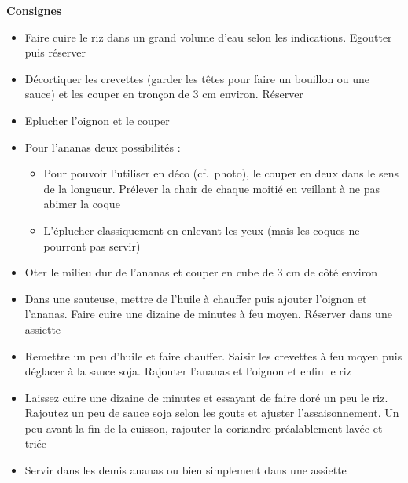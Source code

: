 \documentclass[]{book}
\providecommand{\tightlist}{%
  \setlength{\itemsep}{0pt}\setlength{\parskip}{0pt}}
\begin{document}
\textbf{Consignes}

\begin{itemize}
\tightlist
\item
  Faire cuire le riz dans un grand volume d'eau selon les indications. Egoutter puis réserver
\item
  Décortiquer les crevettes (garder les têtes pour faire un bouillon ou une sauce) et les couper en tronçon de 3 cm environ. Réserver
\item
  Eplucher l'oignon et le couper
\item
  Pour l'ananas deux possibilités :

  \begin{itemize}
  \tightlist
  \item
    Pour pouvoir l'utiliser en déco (cf.~photo), le couper en deux dans le sens de la longueur. Prélever la chair de chaque moitié en veillant à ne pas abimer la coque
  \item
    L'éplucher classiquement en enlevant les yeux (mais les coques ne pourront pas servir)
  \end{itemize}
\item
  Oter le milieu dur de l'ananas et couper en cube de 3 cm de côté environ
\item
  Dans une sauteuse, mettre de l'huile à chauffer puis ajouter l'oignon et l'ananas. Faire cuire une dizaine de minutes à feu moyen. Réserver dans une assiette
\item
  Remettre un peu d'huile et faire chauffer. Saisir les crevettes à feu moyen puis déglacer à la sauce soja. Rajouter l'ananas et l'oignon et enfin le riz
\item
  Laissez cuire une dizaine de minutes et essayant de faire doré un peu le riz. Rajoutez un peu de sauce soja selon les gouts et ajuster l'assaisonnement. Un peu avant la fin de la cuisson, rajouter la coriandre préalablement lavée et triée
\item
  Servir dans les demis ananas ou bien simplement dans une assiette
\end{itemize}
\end{document}

